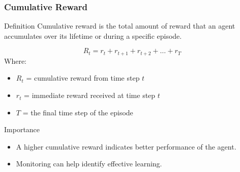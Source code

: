 \documentclass{beamer}
\begin{document}
\begin{frame}[fragile]
    \frametitle{Cumulative Reward}
    \begin{block}{Definition}
        Cumulative reward is the total amount of reward that an agent accumulates over its lifetime or during a specific episode.
    \end{block}
    \begin{equation}
        R_t = r_t + r_{t+1} + r_{t+2} + \ldots + r_T
    \end{equation}
    Where:
    \begin{itemize}
        \item \( R_t \) = cumulative reward from time step \( t \)
        \item \( r_t \) = immediate reward received at time step \( t \)
        \item \( T \) = the final time step of the episode
    \end{itemize}
    
    \begin{block}{Importance}
        \begin{itemize}
            \item A higher cumulative reward indicates better performance of the agent.
            \item Monitoring can help identify effective learning.
        \end{itemize}
    \end{block}
\end{frame}
\end{document}
